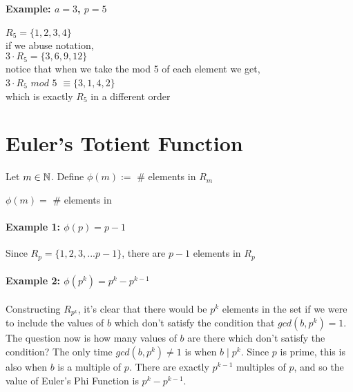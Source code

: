 \documentclass[../main.tex]{subfiles}
\begin{document}
\paragraph{Example: $a=3$, $p=5$}
\begin{center}
    $R_5=\{1,2,3,4\}$ \\
    if we abuse notation, \\
    $3 \cdot R_5 = \{3,6,9,12\}$ \\
    notice that when we take the mod 5 of each element we get, \\
    $3 \cdot R_5$ $mod$ $5$ $\equiv \{3,1,4,2\}$ \\
    which is exactly $R_5$ in a different order
\end{center}

\section{Euler's Totient Function}
\begin{defn}
    Let $m \in \mathbb{N}$. Define $\phi(m):=$ \# elements in $R_m$ \\
    \centerline{$\phi(m)=$ \# elements in }
\end{defn}

\paragraph{Example 1: $\phi(p)=p-1$ \\}
Since $R_p=\{1,2,3,...p-1\}$, there are $p-1$ elements in $R_p$

\paragraph{Example 2: $\phi(p^k)=p^k-p^{k-1}$ \\}
Constructing $R_{p^k}$, it's clear that there would be $p^k$ elements in the set if we were to include the values of $b$ which don't satisfy the condition that $gcd(b,p^k)=1$. The question now is how many values of $b$ are there which don't satisfy the condition? The only time $gcd(b,p^k) \neq 1$ is when $b \mid p^k$. Since $p$ is prime, this is also when $b$ is a multiple of $p$. There are exactly $p^{k-1}$ multiples of $p$, and so the value of Euler's Phi Function is $p^k - p^{k-1}$.
\end{document}
